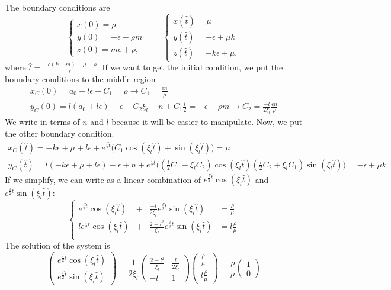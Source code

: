\documentclass[a4paper,preprint,11pt]{article}
\begin{document}
The boundary conditions are
$$
\left\{
\begin{array}{l}
x(0) = \rho  \\
y(0) = -\epsilon - \rho m \\
z(0) = m\epsilon + \rho,
\end{array}
\right. \quad\quad
\left\{
\begin{array}{l}
x(\hat{t}) = \mu \\
y(\hat{t}) = -\epsilon + \mu k \\
z(\hat{t}) = -k\epsilon+\mu,
\end{array}
\right. 
$$
where $\hat{t}=\frac{-\epsilon(k+m)+\mu-\rho}{\epsilon}$. If we want to get the initial condition, we put the boundary conditions to the middle region
$$
\begin{array}{l}
x_C(0) = a_0 + l\epsilon + C_1 = \rho \rightarrow \boxed{C_1 = \frac{\epsilon n}{\rho}} \\
y_C(0) = l(a_0+l\epsilon) - \epsilon -C_2\xi_l+ n+C_1\frac{l}{2} = -\epsilon-\rho m \rightarrow \boxed{C_2 = \frac{-l}{2\xi_l}\frac{\epsilon n}{\rho}}
\end{array}
$$
We write in terms of $ n$ and $l$ because it will be easier to manipulate. Now, we put the other boundary condition.
$$
\begin{array}{l}
x_C(\hat{t}) = -k\epsilon + \mu + l\epsilon + e^{\frac{l}{2}\hat{t}}\big(C_1\cos(\xi_l\hat{t})+\sin(\xi_l\hat{t})\big) = \mu \\
y_C(\hat{t}) = l(-k\epsilon+\mu+l\epsilon) - \epsilon + n + e^{\frac{l}{2}\hat{t}}\big((\frac{l}{2}C_1-\xi_lC_2)\cos(\xi_l\hat{t})  (\frac{l}{2}C_2+\xi_lC_1)\sin(\xi_l\hat{t})\big) = -\epsilon + \mu k
\end{array}
$$
If we simplify, we can write as a linear combination of $e^{\frac{l}{2}\hat{t}}\cos(\xi_l\hat{t})$ and $e^{\frac{l}{2}\hat{t}}\sin(\xi_l\hat{t})$:
$$
\left\{
\begin{array}{rcrl}
e^{\frac{l}{2}\hat{t}}\cos(\xi_l\hat{t}) & + & \frac{-l}{2\xi_l}e^{\frac{l}{2}\hat{t}}\sin(\xi_l\hat{t}) & = \frac{\rho}{\mu} \\
l e^{\frac{l}{2}\hat{t}}\cos(\xi_l\hat{t}) & + & \frac{2-l^2}{\xi_l} e^{\frac{l}{2}\hat{t}}\sin(\xi_l\hat{t}) & = l\frac{\rho}{\mu} \\ 
\end{array}
\right.
$$
The solution of the system is
$$
\begin{pmatrix}
e^{\frac{l}{2}\hat{t}}\cos(\xi_l\hat{t}) \\
e^{\frac{l}{2}\hat{t}}\sin(\xi_l\hat{t})
\end{pmatrix}
=
\frac{1}{2\xi_l}
\begin{pmatrix}
\frac{2-l^2}{\xi_l} & \frac{l}{2\xi_l} \\
-l & 1
\end{pmatrix}
\begin{pmatrix}
\frac{\rho}{\mu} \\ l\frac{\rho}{\mu}
\end{pmatrix}
=
\frac{\rho}{\mu}
\begin{pmatrix}
1 \\ 0
\end{pmatrix}
$$
\end{document}
